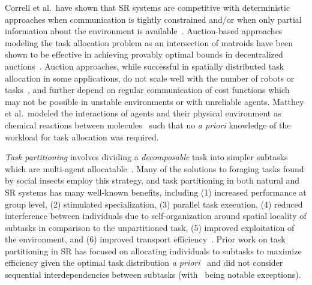 Correll et al.~have shown that SR systems are competitive with deterministic
approaches when communication is tightly constrained and/or when only partial
information about the environment is available~\cite{Correll2008}. Auction-based
approaches modeling the task allocation problem as an intersection of matroids have
been shown to be effective in achieving provably optimal bounds in decentralized
auctions~\cite{Williams2017}. Auction approaches, while successful in spatially
distributed task allocation in some applications, do not scale well with the number
of robots or tasks~\cite{Hsieh2008}, and further depend on regular communication of
cost functions which may not be possible in unstable environments or with unreliable
agents. Matthey et al.~modeled the interactions of agents and their physical
environment as chemical reactions between molecules~\cite{Matthey2009} such that no
\emph{a priori} knowledge of the workload for task allocation was required.

%

\emph{Task partitioning} involves dividing a \emph{decomposable} task into simpler
subtasks which are multi-agent allocatable~\cite{Ratnieks1999, Korsah2013}. Many of
the solutions to foraging tasks found by social insects employ this strategy, and
task partitioning in both natural and SR systems has many well-known benefits,
including (1) increased performance at group level, (2) stimulated specialization,
(3) parallel task execution, (4) reduced interference between individuals due to
self-organization around spatial locality of subtasks in comparison to the
unpartitioned task, (5) improved exploitation of the environment, and (6) improved
transport efficiency~\cite{Hart2002,Pini2011b,Pini2011a}. Prior work on task
partitioning in SR has focused on allocating individuals to subtasks to maximize
efficiency given the optimal task distribution \emph{a
  priori}~\cite{Correll2008,Berman2009,Matthey2009,Hsieh2008} and did not consider
sequential interdependencies between subtasks
(with~\cite{Pini2011b,Brutschy2014,Ferrante2015,Frison2010,Harwell2018} being notable
exceptions).


